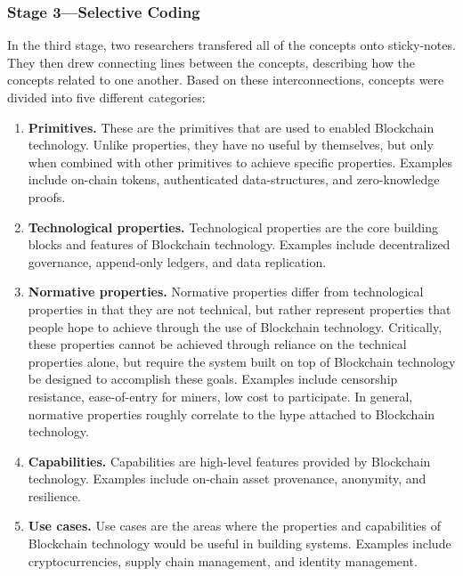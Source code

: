 \subsubsection{Stage 3---Selective Coding}
In the third stage, two researchers transfered all of the concepts onto sticky-notes.
They then drew connecting lines between the concepts, describing how the concepts related to one another.
Based on these interconnections, concepts were divided into five different categories:

\begin{enumerate}
	\item \textbf{Primitives.} These are the primitives that are used to enabled Blockchain technology. Unlike properties, they have no useful by themselves, but only when combined with other primitives to achieve specific properties. Examples include on-chain tokens, authenticated data-structures, and zero-knowledge proofs.
	
	\item \textbf{Technological properties.} Technological properties are the core building blocks and features of Blockchain technology. Examples include decentralized governance, append-only ledgers, and data replication.
	
	\item \textbf{Normative properties.} Normative properties differ from technological properties in that they are not technical, but rather represent properties that people hope to achieve through the use of Blockchain technology. Critically, these properties cannot be achieved through reliance on the technical properties alone, but require the system built on top of Blockchain technology be designed to accomplish these goals. Examples include censorship resistance, ease-of-entry for miners, low cost to participate.
	In general, normative properties roughly correlate to the hype attached to Blockchain technology.

	\item \textbf{Capabilities.} Capabilities are high-level features provided by Blockchain technology. Examples include on-chain asset provenance, anonymity, and resilience.
	
	\item \textbf{Use cases.} Use cases are the areas where the properties and capabilities of Blockchain technology would be useful in building systems. Examples include cryptocurrencies, supply chain management, and identity management.
\end{enumerate}


